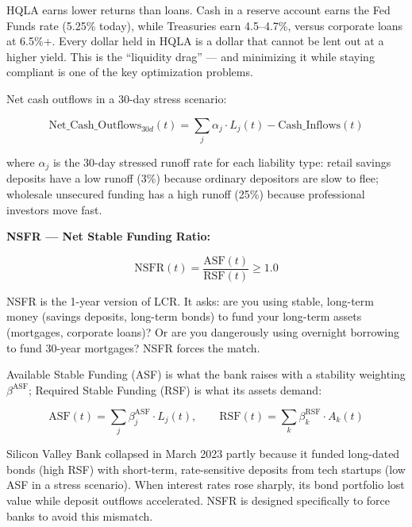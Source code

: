 \documentclass[12pt,a4paper]{article}
\begin{document}
HQLA earns lower returns than loans.  Cash in a reserve account earns the
Fed Funds rate (5.25\% today), while Treasuries earn 4.5--4.7\%, versus
corporate loans at 6.5\%+.  Every dollar held in HQLA is a dollar that
cannot be lent out at a higher yield.  This is the ``liquidity drag'' ---
and minimizing it while staying compliant is one of the key optimization
problems.

Net cash outflows in a 30-day stress scenario:

\begin{equation}
  \text{Net\_Cash\_Outflows}_{30d}(t) = \sum_j \alpha_j \cdot L_j(t) - \text{Cash\_Inflows}(t)
\end{equation}

where $\alpha_j$ is the 30-day stressed runoff rate for each liability type:
retail savings deposits have a low runoff (3\%) because ordinary depositors
are slow to flee; wholesale unsecured funding has a high runoff (25\%) because
professional investors move fast.

\textbf{NSFR --- Net Stable Funding Ratio:}

\begin{equation}
  \text{NSFR}(t) = \frac{\text{ASF}(t)}{\text{RSF}(t)} \geq 1.0
  \label{eq:nsfr}
\end{equation}

\begin{mdframed}[style=plainenglish]
NSFR is the 1-year version of LCR.  It asks: are you using stable, long-term
money (savings deposits, long-term bonds) to fund your long-term assets
(mortgages, corporate loans)?  Or are you dangerously using overnight borrowing
to fund 30-year mortgages?  NSFR forces the match.
\end{mdframed}

Available Stable Funding (ASF) is what the bank raises with a stability
weighting $\beta^{\text{ASF}}$; Required Stable Funding (RSF) is what its
assets demand:

\begin{equation}
  \text{ASF}(t) = \sum_j \beta_j^{\text{ASF}} \cdot L_j(t), \qquad
  \text{RSF}(t) = \sum_k \beta_k^{\text{RSF}} \cdot A_k(t)
\end{equation}

\begin{mdframed}[style=casestudy]
Silicon Valley Bank collapsed in March 2023 partly because it funded long-dated
bonds (high RSF) with short-term, rate-sensitive deposits from tech startups
(low ASF in a stress scenario).  When interest rates rose sharply, its bond
portfolio lost value while deposit outflows accelerated.  NSFR is designed
specifically to force banks to avoid this mismatch.
\end{mdframed}
\end{document}
